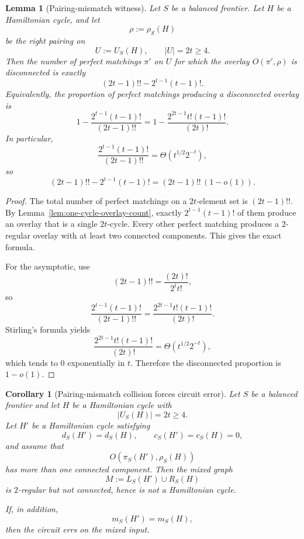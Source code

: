 \documentclass[11pt]{article}
\newtheorem{lemma}[theorem]{Lemma}
\newtheorem{corollary}[theorem]{Corollary}
\begin{document}
\begin{lemma}[Pairing-mismatch witness]\label{lem:pairing-witness}
Let $S$ be a balanced frontier. Let $H$ be a Hamiltonian cycle, and let
\[
\rho:=\rho_S(H)
\]
be the right pairing on
\[
U:=U_S(H),
\qquad
|U|=2t\ge 4.
\]
Then the number of perfect matchings $\pi'$ on $U$ for which the overlay $O(\pi',\rho)$ is
\emph{disconnected} is exactly
\[
(2t-1)!! - 2^{t-1}(t-1)!.
\]
Equivalently, the proportion of perfect matchings producing a disconnected overlay is
\[
1-\frac{2^{t-1}(t-1)!}{(2t-1)!!}
=
1-\frac{2^{2t-1}t!(t-1)!}{(2t)!}.
\]
In particular,
\[
\frac{2^{t-1}(t-1)!}{(2t-1)!!}
=
\Theta(t^{1/2}2^{-t}),
\]
so
\[
(2t-1)!! - 2^{t-1}(t-1)!
=
(2t-1)!!\,(1-o(1)).
\]
\end{lemma}

\begin{proof}
The total number of perfect matchings on a $2t$-element set is $(2t-1)!!$. By
Lemma~\ref{lem:one-cycle-overlay-count}, exactly $2^{t-1}(t-1)!$ of them produce an overlay that is
a single $2t$-cycle. Every other perfect matching produces a $2$-regular overlay with at least two
connected components. This gives the exact formula.

For the asymptotic, use
\[
(2t-1)!!=\frac{(2t)!}{2^t t!},
\]
so
\[
\frac{2^{t-1}(t-1)!}{(2t-1)!!}
=
\frac{2^{2t-1}t!(t-1)!}{(2t)!}.
\]
Stirling's formula yields
\[
\frac{2^{2t-1}t!(t-1)!}{(2t)!}
=
\Theta(t^{1/2}2^{-t}),
\]
which tends to $0$ exponentially in $t$. Therefore the disconnected proportion is $1-o(1)$.
\end{proof}

\begin{corollary}[Pairing-mismatch collision forces circuit error]\label{cor:pairing-collision}
Let $S$ be a balanced frontier and let $H$ be a Hamiltonian cycle with
\[
|U_S(H)|=2t\ge 4.
\]
Let $H'$ be a Hamiltonian cycle satisfying
\[
d_S(H')=d_S(H),\qquad c_S(H')=c_S(H)=0,
\]
and assume that
\[
O(\pi_S(H'),\rho_S(H))
\]
has more than one connected component. Then the mixed graph
\[
M:=L_S(H')\cup R_S(H)
\]
is $2$-regular but not connected, hence is not a Hamiltonian cycle.

If, in addition,
\[
m_S(H')=m_S(H),
\]
then the circuit errs on the mixed input.
\end{corollary}
\end{document}
